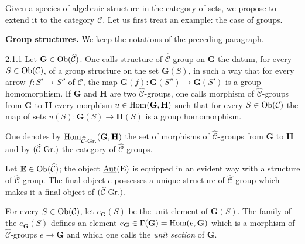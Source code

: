 \label{I.sec.2}

Given a species of algebraic structure in the category of sets, we propose to extend it to the category \(\mathcal{C}\). Let us first treat an example: the case of groups.

\textbf{Group structures.}
We keep the notations of the preceding paragraph.

\begin{definition}{2.1.1}
\label{I.2.1.1}
Let \(\mathbf{G}\in\operatorname{Ob}(\widehat{\mathcal{C}})\). One calls structure of \(\widehat{\mathcal{C}}\)-group on \(\mathbf{G}\) the datum, for every \(S\in\operatorname{Ob}(\mathcal{C})\), of a group structure on the set \(\mathbf{G}(S)\), in such a way that for every arrow \(f\colon S'\to S''\) of \(\mathcal{C}\), the map \(\mathbf{G}(f)\colon\mathbf{G}(S'')\to\mathbf{G}(S')\) is a group homomorphism. If \(\mathbf{G}\) and \(\mathbf{H}\) are two \(\widehat{\mathcal{C}}\)-groups, one calls morphism of \(\widehat{\mathcal{C}}\)-groups from \(\mathbf{G}\) to \(\mathbf{H}\) every morphism \(u\in\operatorname{Hom}(\mathbf{G},\mathbf{H})\) such that for every \(S\in\operatorname{Ob}(\mathcal{C})\) the map of sets \(u(S)\colon\mathbf{G}(S)\to\mathbf{H}(S)\) is a group homomorphism.

One denotes by \(\operatorname{Hom}_{\widehat{\mathcal{C}}\textup{-Gr.}}(\mathbf{G},\mathbf{H})\) the set of morphisms of \(\widehat{\mathcal{C}}\)-groups from \(\mathbf{G}\) to \(\mathbf{H}\) and by \((\widehat{\mathcal{C}}\textup{-Gr.})\) the category of \(\widehat{\mathcal{C}}\)-groups.
\end{definition}

\begin{examples}{\unskip}
Let \(\mathbf{E}\in\operatorname{Ob}(\widehat{\mathcal{C}})\); the object \(\underline{\operatorname{Aut}}(\mathbf{E})\) is equipped in an evident way with a structure of \(\widehat{\mathcal{C}}\)-group. The final object \(e\) possesses a unique structure of \(\widehat{\mathcal{C}}\)-group which makes it a final object of \((\widehat{\mathcal{C}}\textup{-Gr.})\).
\end{examples}

For every \(S\in\operatorname{Ob}(\mathcal{C})\), let \(e_{\mathbf{G}}(S)\) be the unit element of \(\mathbf{G}(S)\). The family of the \(e_{\mathbf{G}}(S)\) defines an element \(e_{\mathbf{G}}\in\Gamma(\mathbf{G})=\operatorname{Hom}(e,\mathbf{G})\) which is a morphism of \(\widehat{\mathcal{C}}\)-groups \(e\to\mathbf{G}\) and which one calls the \emph{unit section} of \(\mathbf{G}\).
